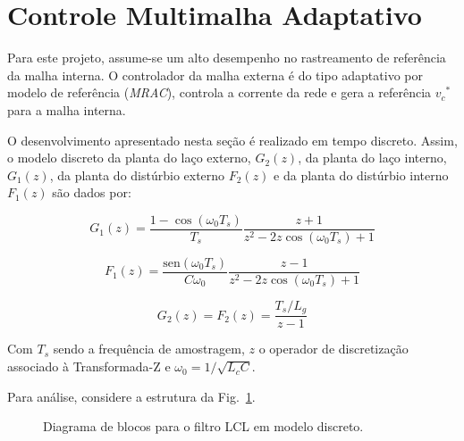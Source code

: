 \section{Controle Multimalha Adaptativo}

    Para este projeto, assume-se um alto desempenho no rastreamento de referência
    da malha interna. O controlador da malha externa é do tipo adaptativo por modelo
    de referência (\textit{MRAC}), controla a corrente da rede e gera a referência
    ${v_c}^*$ para a malha interna.

    O desenvolvimento apresentado nesta seção é realizado em tempo discreto. Assim,
    o modelo discreto da planta do laço externo, $G_2 (z)$, da planta do laço interno,
    $G_1 (z)$, da planta do distúrbio externo $F_2(z)$ e da planta do distúrbio interno
    $F_1(z)$ são dados por:

    \begin{equation}
        G_1(z) = \frac{1 - \cos(\omega_0 T_s)}{T_s} \frac{z + 1}{z^2 - 2z \cos(\omega_0 T_s) + 1}
    \end{equation}

    \begin{equation}
        F_1(z) = \frac{\text{sen}(\omega_0 T_s)}{C \omega_0} \frac{z - 1}{z^2 - 2z \cos(\omega_0 T_s) + 1}
    \end{equation}

    \begin{equation}
        G_2(z) = F_2(z) = \frac{T_s / L_g}{z - 1}
        \label{eq:g_2_discreta}
    \end{equation}

    Com $T_s$ sendo a frequência de amostragem, $z$ o operador de discretização
    associado à Transformada-Z e $\omega_0 = 1 / \sqrt{L_c C}$.

    Para análise, considere a estrutura da Fig.~\ref{fig:LCL_discreto}.

    \begin{figure}[htb]
        \renewcommand\figurename{Fig.}
        \caption{Diagrama de blocos para o filtro LCL em modelo discreto.}
        \label{fig:LCL_discreto}
    \end{figure}

